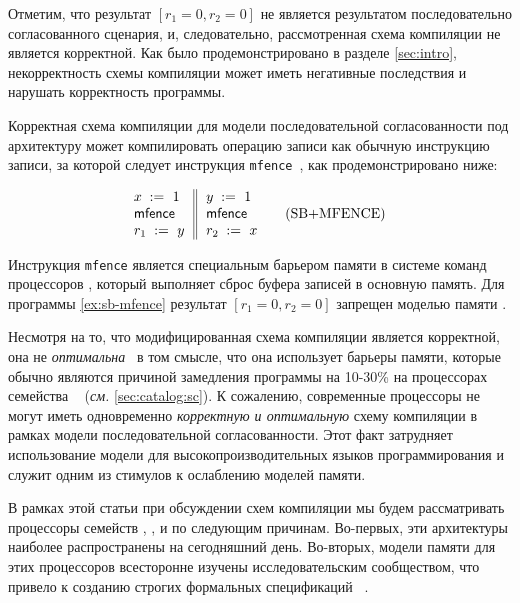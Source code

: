 Отметим, что результат ${[r_1=0, r_2=0]}$ не является результатом последовательно согласованного сценария,
и, следовательно, рассмотренная схема компиляции не является корректной. 
Как было продемонстрировано в разделе \cref{sec:intro}, 
некорректность схемы компиляции может иметь 
негативные последствия и нарушать корректность программы. 

Корректная схема компиляции для модели последовательной согласованности 
под архитектуру \Intel может компилировать 
операцию записи как обычную инструкцию записи, за которой следует 
инструкция \texttt{mfence}~\cite{Sewell-al:CACM10, Batty-al:POPL11}, 
как продемонстрировано ниже:

\begin{equation*}
\inarrII{
   \writeInst{}{x}{1}   \\
   \mfenceInst          \\
   \readInst{}{r_1}{y}  \\
}{
  \writeInst{}{y}{1}   \\
  \mfenceInst          \\
  \readInst{}{r_2}{x}  \\
}
\tag{SB+MFENCE}\label{ex:sb-mfence}
\end{equation*}

Инструкция \texttt{mfence} является специальным барьером памяти в системе команд процессоров 
\Intel, который выполняет сброс буфера записей в основную память. 
Для программы \ref{ex:sb-mfence} результат ${[r_1=0, r_2=0]}$
запрещен моделью памяти \Intel. 

Несмотря на то, что модифицированная схема компиляции является корректной, 
она не \emph{оптимальна}~\cite{OptimalCompilationCPP}
в том смысле, что она использует барьеры памяти,
которые обычно являются причиной замедления программы 
на 10-30\% на процессорах семейства \Intel~\cite{Marino-al:PLDI11, Liu-al:OOPSLA17}
(\emph{см.} \cref{sec:catalog:sc}).
К сожалению, современные процессоры не могут  иметь одновременно \emph{корректную и оптимальную} 
схему компиляции в рамках модели последовательной согласованности. 
Этот факт затрудняет  использование модели \SC  
для высокопроизводительных языков программирования 
и служит одним из стимулов к ослаблению моделей памяти. 

В рамках этой статьи при обсуждении 
схем компиляции мы будем рассматривать процессоры семейств
\Intel, ,  и \POWER 
по следующим причинам. 
Во-первых, эти архитектуры наиболее 
распространены на сегодняшний день. 
Во-вторых, модели памяти для этих процессоров 
всесторонне изучены  исследовательским сообществом, 
что привело к созданию строгих 
формальных спецификаций~%
\cite{Sewell-al:CACM10, Sarkar-al:PLDI11, 
Flur-al:POPL16, Pulte-al:POPL18}. 

